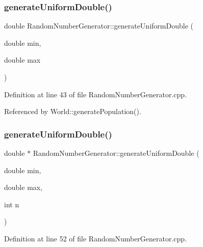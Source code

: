 \mbox{\label{class_random_number_generator_ad89bab678dc9b098440aba4b0d15967f}} 
\subsubsection{generate\+Uniform\+Double()\hspace{0.1cm}{\footnotesize\ttfamily [1/2]}}
{\footnotesize\ttfamily double Random\+Number\+Generator\+::generate\+Uniform\+Double (\begin{DoxyParamCaption}\item[{double}]{min,  }\item[{double}]{max }\end{DoxyParamCaption})}



Definition at line 43 of file Random\+Number\+Generator.\+cpp.



Referenced by World\+::generate\+Population().

\mbox{\label{class_random_number_generator_a335940c67220ca20da3401be59b22808}} 
\subsubsection{generate\+Uniform\+Double()\hspace{0.1cm}{\footnotesize\ttfamily [2/2]}}
{\footnotesize\ttfamily double $\ast$ Random\+Number\+Generator\+::generate\+Uniform\+Double (\begin{DoxyParamCaption}\item[{double}]{min,  }\item[{double}]{max,  }\item[{int}]{n }\end{DoxyParamCaption})}



Definition at line 52 of file Random\+Number\+Generator.\+cpp.

\mbox{\label{class_random_number_generator_ae2bbbe3f14737ce9eaa573e26e873b5a}} 
